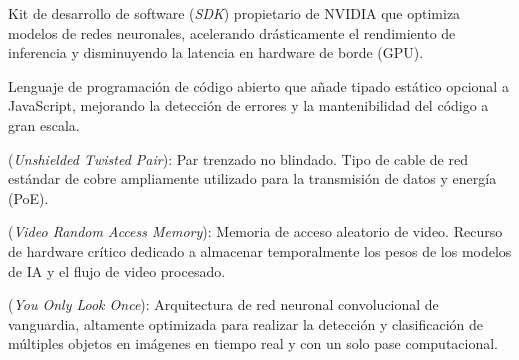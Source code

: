 \begin{description}[leftmargin=3cm, style=nextline]
    \item[TensorRT] Kit de desarrollo de software (\textit{SDK}) propietario de NVIDIA que optimiza modelos de redes neuronales, acelerando drásticamente el rendimiento de inferencia y disminuyendo la latencia en hardware de borde (GPU).
    
    \item[TypeScript] Lenguaje de programación de código abierto que añade tipado estático opcional a JavaScript, mejorando la detección de errores y la mantenibilidad del código a gran escala.
    
    \item[UTP] (\textit{Unshielded Twisted Pair}): Par trenzado no blindado. Tipo de cable de red estándar de cobre ampliamente utilizado para la transmisión de datos y energía (PoE).
    
    \item[VRAM] (\textit{Video Random Access Memory}): Memoria de acceso aleatorio de video. Recurso de hardware crítico dedicado a almacenar temporalmente los pesos de los modelos de IA y el flujo de video procesado.
    
    \item[YOLO] (\textit{You Only Look Once}): Arquitectura de red neuronal convolucional de vanguardia, altamente optimizada para realizar la detección y clasificación de múltiples objetos en imágenes en tiempo real y con un solo pase computacional.
\end{description}
